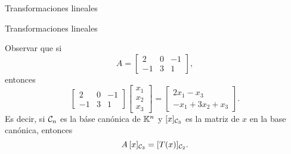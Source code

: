 \begin{chapter}{Transformaciones lineales}
\begin{section}{Transformaciones lineales}
\begin{ejemplo*}
            Observar que si 
            $$
             A = \begin{bmatrix}
             2&0&-1 \\ -1&3&1
             \end{bmatrix},
            $$
            entonces
            $$
            \begin{bmatrix}
            2&0&-1 \\ -1&3&1
            \end{bmatrix} 
            \begin{bmatrix}
            x_1\\x_2\\x_3
            \end{bmatrix} =
            \begin{bmatrix}
            2x_1 - x_3 \\ -x_1+3x_2+x_3
            \end{bmatrix}.
            $$
            Es decir,  si $\mathcal{C}_n$  es la báse canónica de $\mathbb K^n$ y $[x]_{\mathcal{C}_3}$ es la matriz de $x$ en la base canónica,  entonces 
            $$
            A\,[x]_{\mathcal{C}_3} = [T(x)]_{\mathcal{C}_2}.
            $$ 
            \end{ejemplo*}
        

\end{section}
\end{chapter}
